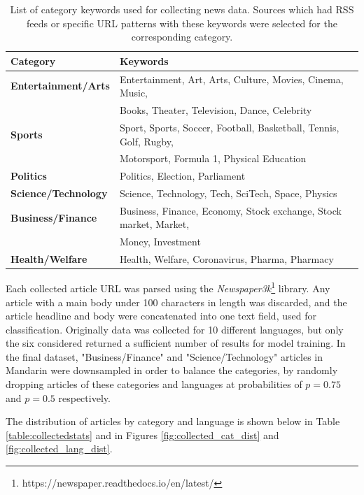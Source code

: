 \documentclass{l4proj}
\begin{document}
\begin{table}[]
\begin{tabular}{ll}
\hline
\textbf{Category}           & \textbf{Keywords}                                                 \\ \hline
\textbf{Entertainment/Arts} & Entertainment, Art, Arts, Culture, Movies, Cinema, Music,         \\
\textbf{}                   & Books, Theater, Television, Dance, Celebrity                      \\
\textbf{Sports}             & Sport, Sports, Soccer, Football, Basketball, Tennis, Golf, Rugby, \\
\textbf{}                   & Motorsport, Formula 1, Physical Education                         \\
\textbf{Politics}           & Politics, Election, Parliament                                    \\
\textbf{Science/Technology} & Science, Technology, Tech, SciTech, Space, Physics                \\
\textbf{Business/Finance}   & Business, Finance, Economy, Stock exchange, Stock market, Market, \\
\textbf{}                   & Money, Investment                                                 \\
\textbf{Health/Welfare}     & Health, Welfare, Coronavirus, Pharma, Pharmacy                    \\ \hline
\end{tabular}
\caption{List of category keywords used for collecting news data. Sources which had RSS feeds or specific URL patterns with these keywords were selected for the corresponding category.}
\label{fig:dataset_category_keywords}
\end{table}

Each collected article URL was parsed using the \emph{Newspaper3k}\footnote{https://newspaper.readthedocs.io/en/latest/} library. Any article with a main body under 100 characters in length was discarded, and the article headline and body were concatenated into one text field, used for classification. Originally data was collected for 10 different languages, but only the six considered returned a sufficient number of results for model training. In the final dataset, "Business/Finance" and "Science/Technology" articles in Mandarin were downsampled in order to balance the categories, by randomly dropping articles of these categories and languages at probabilities of $p=0.75$ and $p=0.5$ respectively. \par
The distribution of articles by category and language is shown below in Table \ref{table:collectedstats} and in Figures \ref{fig:collected_cat_dist} and \ref{fig:collected_lang_dist}.
\end{document}
